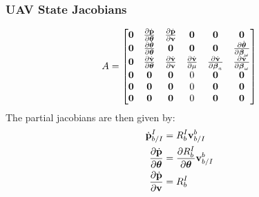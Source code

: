 \subsubsection{UAV State Jacobians}
\begin{equation}
  A =
  \begin{bmatrix}
    \vect{0} & \frac{\partial \dot{\vect{p}}}{\partial \vect{\theta}} &
    \frac{\partial \dot{\vect{p}}}{\partial \vect{v}} & \vect{0} & \vect{0} &
    \vect{0} \\
    \vect{0} & \frac{\partial \dot{\vect{\theta}}}{\partial \vect{\theta}} &
    \vect{0} & \vect{0} & \vect{0} &
    \frac{\partial \dot{\vect{\theta}}}{\partial \vect{\beta}_\omega} \\
    \vect{0} & \frac{\partial \dot{\vect{v}}}{\partial \vect{\theta}} &
    \frac{\partial \dot{\vect{v}}}{\partial \vect{v}} & \frac{\partial
    \dot{\vect{v}}}{\partial \mu} & 
    \frac{\partial \dot{\vect{v}}}{\partial \vect{\beta}_a} &
    \frac{\partial \dot{\vect{v}}}{\partial \vect{\beta}_\omega} \\
    \vect{0} & \vect{0} & \vect{0} & 0 & \vect{0} & \vect{0} \\
    \vect{0} & \vect{0} & \vect{0} & 0 & \vect{0} & \vect{0} \\
    \vect{0} & \vect{0} & \vect{0} & 0 & \vect{0} & \vect{0}
  \end{bmatrix}
\end{equation}
The partial jacobians are then given by:
\begin{align*}
  \dot{\vect{p}}_{b/I}^I &= R_b^I \vect{v}_{b/I}^b \\
  \frac{\partial \dot{\vect{p}}}{\partial \vect{\theta}} &= 
  \frac{\partial R_b^I}{\partial \vect{\theta}} \vect{v}_{b/I}^b \\
  \frac{\partial \dot{\vect{p}}}{\partial \vect{v}} &= R_b^I
\end{align*}

